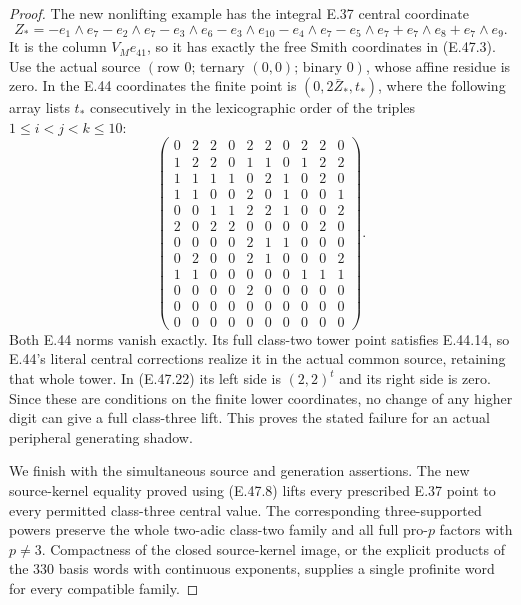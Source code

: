\begin{proof}
The new nonlifting example has the integral
E.37 central coordinate
\[
 Z_*=-e_1\wedge e_7-e_2\wedge e_7-e_3\wedge e_6
       -e_3\wedge e_{10}-e_4\wedge e_7-e_5\wedge e_7
       +e_7\wedge e_8+e_7\wedge e_9.
 \tag{E.47.23}
\]
It is the column $V_Me_{41}$, so it has exactly
the free Smith coordinates in
\textup{(E.47.3)}.  Use the actual source
$(\text{row }0;\,\text{ternary }(0,0);\,\text{binary }0)$,
whose affine residue is zero.
In the E.44 coordinates the finite point is
$(0,2\bar Z_*,t_*)$, where the following array
lists $t_*$ consecutively in the lexicographic
order of the triples $1\leq i<j<k\leq10$:
\[
\begin{pmatrix}
0&2&2&0&2&2&0&2&2&0\\
1&2&2&0&1&1&0&1&2&2\\
1&1&1&1&0&2&1&0&2&0\\
1&1&0&0&2&0&1&0&0&1\\
0&0&1&1&2&2&1&0&0&2\\
2&0&2&2&0&0&0&0&2&0\\
0&0&0&0&2&1&1&0&0&0\\
0&2&0&0&2&1&0&0&0&2\\
1&1&0&0&0&0&0&1&1&1\\
0&0&0&0&2&0&0&0&0&0\\
0&0&0&0&0&0&0&0&0&0\\
0&0&0&0&0&0&0&0&0&0
\end{pmatrix}.
 \tag{E.47.24}
\]
Both E.44 norms vanish exactly.  Its full
class-two tower point satisfies E.44.14,
so E.44's literal central corrections realize
it in the actual common source, retaining
that whole tower.  In \textup{(E.47.22)} its
left side is $(2,2)^t$ and its right side is
zero.  Since these are conditions on the
finite lower coordinates, no change of any
higher digit can give a full class-three lift.
This proves the stated failure for an actual
peripheral generating shadow.

We finish with the simultaneous source and
generation assertions.  The new source-kernel
equality proved using \textup{(E.47.8)} lifts
every prescribed E.37 point to every permitted
class-three central value.  The corresponding
three-supported powers preserve the whole
two-adic class-two family and all full pro-$p$
factors with $p\ne3$.  Compactness of the closed
source-kernel image, or the explicit products
of the $330$ basis words with continuous
exponents, supplies a single profinite word
for every compatible family.


\end{proof}
